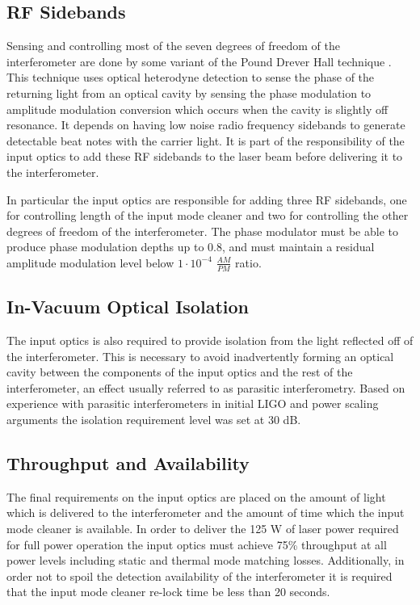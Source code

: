 \subsection{RF Sidebands}
Sensing and controlling most of the seven degrees of freedom of the interferometer are done by some 
variant of the Pound Drever Hall technique \cite{drever_laser_1983}.  
This technique uses optical heterodyne detection to sense the phase of the returning light from 
an optical cavity by sensing the phase modulation to amplitude modulation conversion which occurs 
when the cavity is slightly off resonance.  
It depends on having low noise radio frequency sidebands to generate detectable beat notes 
with the carrier light.
It is part of the responsibility of the input optics to add these RF sidebands to the laser beam 
before delivering it to the interferometer.  

In particular the input optics are responsible for adding three RF sidebands, one for controlling 
length of the input mode cleaner and two for controlling the other degrees of freedom of the 
interferometer.  
The phase modulator must be able to produce phase modulation depths up to 0.8, and must 
maintain a residual amplitude modulation level below $1\cdot10^{-4}$ $\frac{AM}{PM}$ ratio.  


\subsection{In-Vacuum Optical Isolation}
The input optics is also required to provide isolation from the light reflected off of the 
interferometer.  
This is necessary to avoid inadvertently forming an optical cavity between the components 
of the input optics and the rest of the interferometer, 
an effect usually referred to as parasitic interferometry.  
Based on experience with parasitic interferometers in initial LIGO and power scaling arguments 
the isolation requirement level was set at 30 dB\cite{ligo_T020020}.  


\subsection{Throughput and Availability}
The final requirements on the input optics are placed on the amount of light which is delivered 
to the interferometer and the amount of time which the input mode cleaner is available.  
In order to deliver the 125 W of laser power required for full power operation the input optics 
must achieve 75\% throughput at all power levels including static and thermal mode matching losses.  
Additionally, in order not to spoil the detection availability of the interferometer 
it is required that the input mode cleaner re-lock time be less than 20 seconds.  
